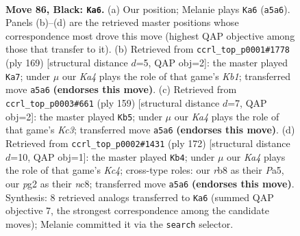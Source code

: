 \documentclass[11pt]{article}
\begin{document}
\clearpage

\begin{figure}[p]\centering
\begin{subfigure}{0.46\textwidth}\centering
\resizebox{\linewidth}{!}{%
\newchessgame
\chessboard[
  setfen={1R6/8/8/k4K2/3r4/8/1N4P1/8 b - - 37 86},
  showmover=false,
  pgfstyle=straightmove, color=movearrow, markmove={a5-a6}
]}
\caption{}
\end{subfigure}\hfill
\begin{subfigure}{0.46\textwidth}\centering
\resizebox{\linewidth}{!}{%
\newchessgame
\chessboard[
  setfen={1k6/8/8/p1N4R/8/8/6r1/4K3 b - - 19 85},
  showmover=false,
  pgfstyle=straightmove, color=movearrow, markmove={b8-a7}
]}
\caption{}
\end{subfigure}
\\[4pt]
\begin{subfigure}{0.46\textwidth}\centering
\resizebox{\linewidth}{!}{%
\newchessgame
\chessboard[
  setfen={8/R7/2k5/7p/N7/4K3/7r/8 b - - 2 80},
  showmover=false,
  pgfstyle=straightmove, color=movearrow, markmove={c6-b5}
]}
\caption{}
\end{subfigure}\hfill
\begin{subfigure}{0.46\textwidth}\centering
\resizebox{\linewidth}{!}{%
\newchessgame
\chessboard[
  setfen={2n5/3R4/4n3/P3k3/2K5/8/8/8 w - - 23 87},
  showmover=false,
  pgfstyle=straightmove, color=movearrow, markmove={c4-b4}
]}
\caption{}
\end{subfigure}
\caption{\textbf{Move 86, Black: \texttt{Ka6}.} (a) Our position; Melanie plays \texttt{Ka6} (\texttt{a5a6}). Panels (b)--(d) are the retrieved master positions whose correspondence most drove this move (highest QAP objective among those that transfer to it). (b) Retrieved from \texttt{ccrl\_top\_p0001\#1778} (ply 169) [structural distance $d$=5, QAP obj=2]: the master played \texttt{Ka7}; under $\mu$ our \emph{Ka4} plays the role of that game's \emph{Kb1}; transferred move \texttt{a5a6} \textbf{(endorses this move)}. (c) Retrieved from \texttt{ccrl\_top\_p0003\#661} (ply 159) [structural distance $d$=7, QAP obj=2]: the master played \texttt{Kb5}; under $\mu$ our \emph{Ka4} plays the role of that game's \emph{Kc3}; transferred move \texttt{a5a6} \textbf{(endorses this move)}. (d) Retrieved from \texttt{ccrl\_top\_p0002\#1431} (ply 172) [structural distance $d$=10, QAP obj=1]: the master played \texttt{Kb4}; under $\mu$ our \emph{Ka4} plays the role of that game's \emph{Kc4}; cross-type roles: our \emph{r}b8 as their \emph{P}a5, our \emph{p}g2 as their \emph{n}c8; transferred move \texttt{a5a6} \textbf{(endorses this move)}. Synthesis: 8 retrieved analogs transferred to \texttt{Ka6} (summed QAP objective 7, the strongest correspondence among the candidate moves); Melanie committed it via the \texttt{search} selector.}
\label{fig:thought-m171}
\end{figure}
\end{document}
